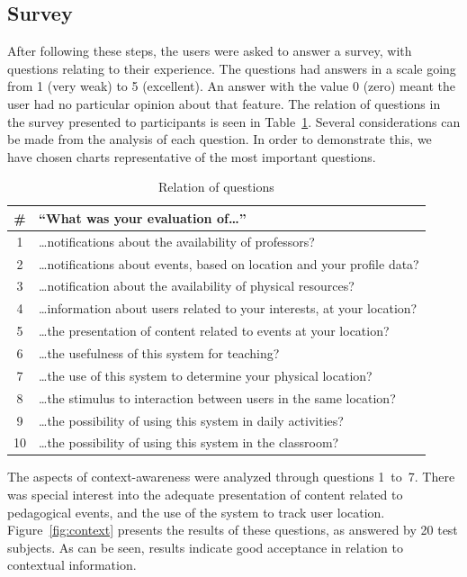 \documentclass[5p,authoryear]{elsarticle}
\begin{document}
%
%
\subsection{Survey}

After following these steps, the users were asked to answer a survey, with
questions relating to their experience. The questions had answers in a scale
going from 1 (very weak) to 5 (excellent). An answer with the value 0 (zero)
meant the user had no particular opinion about that feature. The relation of
questions in the survey presented to participants is seen in
Table~\ref{tab:questions}. Several considerations can be made from the analysis
of each question. In order to demonstrate this, we have chosen charts
representative of the most important questions. 

\begin{table}
  \footnotesize
  \begin{tabular}{cp{7.5cm}}
    \toprule
    \# & ``What was your evaluation of\ldots'' \\
    \midrule
     1 & \ldots{}notifications about the availability of professors? \\ 
     2 & \ldots{}notifications about events, based on location and your profile data? \\
     3 & \ldots{}notification about the availability of physical resources? \\
     4 & \ldots{}information about users related to your interests, at your location? \\
     5 & \ldots{}the presentation of content related to events at your location? \\
     6 & \ldots{}the usefulness of this system for teaching? \\
     7 & \ldots{}the use of this system to determine your physical location? \\
     8 & \ldots{}the stimulus to interaction between users in the same location? \\
     9 & \ldots{}the possibility of using this system in daily activities? \\
    10 & \ldots{}the possibility of using this system in the classroom? \\  
    \bottomrule
  \end{tabular}
  \caption{Relation of questions}
  \label{tab:questions}
\end{table}


The aspects of context-awareness were analyzed through questions 1~to~7. There
was special interest into the adequate presentation of content related to
pedagogical events, and the use of the system to track user location.
Figure~\ref{fig:context} presents the results of these questions, as answered
by 20 test subjects. As can be seen, results indicate good acceptance in
relation to contextual information. 
\end{document}
